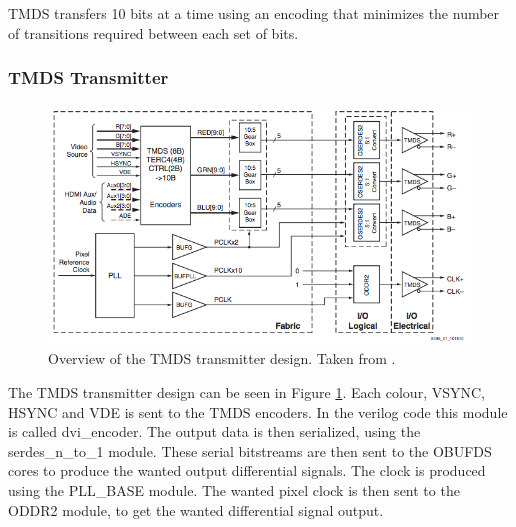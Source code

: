 TMDS transfers 10 bits at a time using an encoding that minimizes the number of transitions required between each set of bits.

\subsubsection{TMDS Transmitter}
\begin{figure}[h!]
    \centering
    \includegraphics[width=\linewidth]{img/TMDStransmitterdesign.png}
    \caption{Overview of the TMDS transmitter design. Taken from \cite{xapp495}.}
    \label{fig:TMDSTransmitter}
\end{figure}
The TMDS transmitter design can be seen in Figure \ref{fig:TMDSTransmitter}.
Each colour, VSYNC, HSYNC and VDE is sent to the TMDS encoders.
In the verilog code this module is called dvi\_encoder.
The output data is then serialized, using the serdes\_n\_to\_1 module.
These serial bitstreams are then sent to the OBUFDS cores to produce the wanted output differential signals.
The clock is produced using the PLL\_BASE module.
The wanted pixel clock is then sent to the ODDR2 module, to get the wanted differential signal output.

